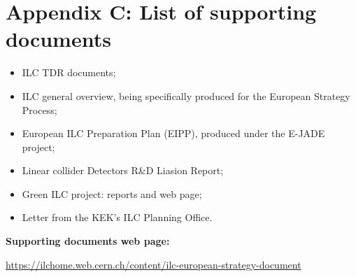 \documentclass[%
reprint,
 floatfix,
 amsmath,amssymb,
 aps,
]{revtex4-1}
\begin{document}
\newpage

\section*{\label{Appendix3} \Large{Appendix C: List of supporting documents} }
\begin{itemize}
\item
ILC TDR documents;
\item
ILC general overview, being specifically produced for the European Strategy Process;
\item
European ILC Preparation Plan (EIPP), produced under the E-JADE project;
\item
Linear collider Detectors R\&D Liasion Report;
\item
Green ILC project: reports and web page;
\item
Letter from the KEK’s ILC Planning Office.

\end{itemize}

\textbf{Supporting documents web page:} 


\url{https://ilchome.web.cern.ch/content/ilc-european-strategy-document}
\end{document}
